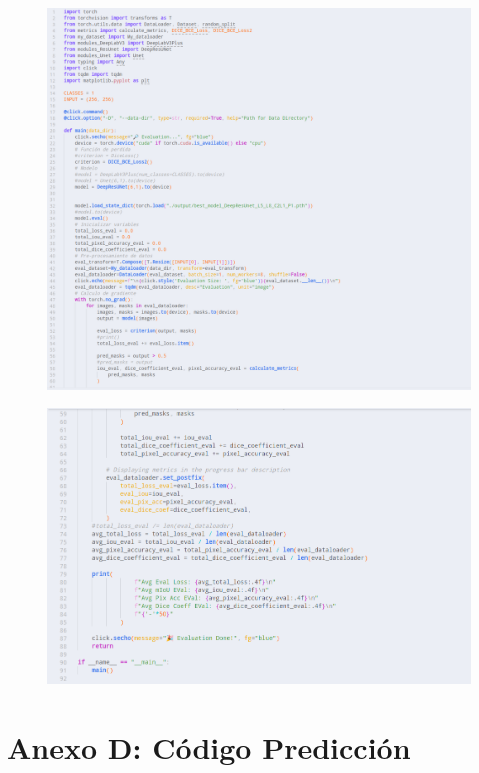\begin{figure}[h!]
	\centering
	\includegraphics[width=0.9\linewidth]{graficos/test}
\end{figure}

\begin{figure}[h!]
	\centering
	\includegraphics[width=0.9\linewidth]{graficos/test2}
\end{figure}

\newpage %
\clearpage
\section*{Anexo D: Código Predicción}

